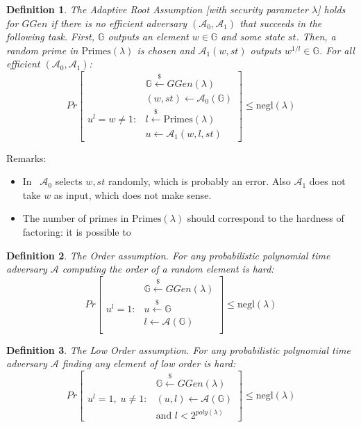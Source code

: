 \documentclass[a4paper]{article}
\newtheorem{definition}{Definition}
\begin{document}
\begin{definition}
The \emph{Adaptive Root Assumption} [with security parameter $\lambda$] holds for
$GGen$ if there is no efficient adversary $(\mathcal{A}_0, \mathcal{A}_1)$ that succeeds in the following task. First,
$\mathbb{G}$ outputs an element $w\in \mathbb{G}$ and some state $st$. Then, a random prime in $\mathrm{Primes}(\lambda)$ is chosen
and $\mathcal{A}_1(w,st)$ outputs $w^{1/l}\in\mathbb{G}$. For all efficient $(\mathcal{A}_0, \mathcal{A}_1)$:
$$
Pr
\begin{bmatrix}
&\mathbb{G}\xleftarrow{\$}GGen(\lambda)\\
& (w,st)\xleftarrow{}\mathcal{A}_0(\mathbb{G})\\
u^l = w\neq 1 :& l\xleftarrow{\$}\mathrm{Primes}(\lambda)\\
&u \xleftarrow{} \mathcal{A}_1(w,l,st)
\end{bmatrix}\leq \mathrm{negl}(\lambda)
$$
\end{definition}
Remarks:
\begin{itemize}
    \item In~\cite{cryptoeprint:2019:1229} $\mathcal{A}_0$ selects $w,st$ randomly, which is probably an error. Also $\mathcal{A}_1$ does not take $w$ as input, which does not make sense.
    \item The number of primes in $\mathrm{Primes}(\lambda)$ should correspond to the hardness of factoring: it is possible to 
\end{itemize}
\begin{definition}
The \emph{Order assumption}. For any probabilistic polynomial time adversary $\mathcal{A}$ computing the order of a random element is hard: 
$$
Pr
\begin{bmatrix}
&\mathbb{G}\xleftarrow{\$}GGen(\lambda)\\
u^l = 1 : &u \xleftarrow{\$}\mathbb{G}\\ 
& l \xleftarrow{} \mathcal{A}(\mathbb{G})\\
\end{bmatrix}\leq \mathrm{negl}(\lambda)
$$

\end{definition}

\begin{definition}
The \emph{Low Order assumption}. For any probabilistic polynomial time adversary $\mathcal{A}$ finding any element of low order is hard: 
$$
Pr
\begin{bmatrix}
&\mathbb{G}\xleftarrow{\$}GGen(\lambda)\\
u^l = 1,\;u\neq 1 :
& (u,l) \xleftarrow{} \mathcal{A}(\mathbb{G})\\
& \text{and }l<2^{poly(\lambda)}
\end{bmatrix}\leq \mathrm{negl}(\lambda)
$$

\end{definition}
\end{document}
